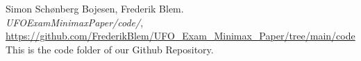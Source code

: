 \begin{thebibliography}{1}
    \label{bib:OurCode}
    Simon Schønberg Bojesen, Frederik Blem.\\
    \textit{UFO\textunderscore Exam\textunderscore Minimax\textunderscore Paper/code/}, \url{https://github.com/FrederikBlem/UFO_Exam_Minimax_Paper/tree/main/code}\\
    This is the code folder of our Github Repository.

    
        
        
        
\end{thebibliography}